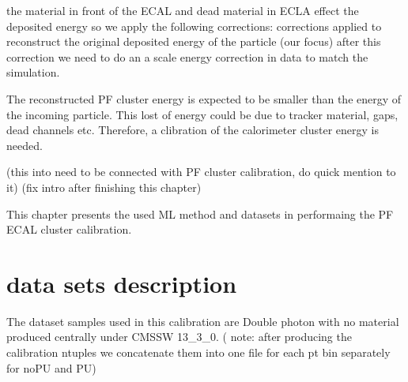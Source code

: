the material in front of the ECAL and dead material in ECLA effect the deposited energy so we apply the following corrections:
corrections applied to reconstruct the original deposited energy of the particle (our focus)
after this correction we need to do an a scale energy correction in data to match the simulation.



The reconstructed PF cluster energy is expected to be smaller than the energy of the incoming particle.
This lost of energy could be due to tracker material, gaps, dead channels etc. Therefore, a clibration of the calorimeter cluster energy is needed. 

(this into need to be connected with PF cluster calibration, do quick mention to it)
(fix intro after finishing this chapter) 

This chapter presents the used ML method and datasets in performaing the PF ECAL cluster calibration.  

\section{data sets description}




The dataset samples used in this calibration are Double photon with no material produced centrally under CMSSW 13_3_0.
( note: after producing	the calibration	ntuples	we concatenate them into one file for each pt bin separately for noPU and PU) 


